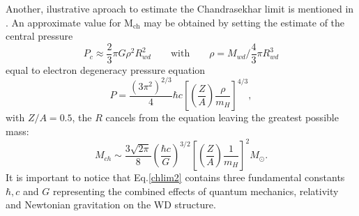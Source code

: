 \documentclass[oneside,a4paper,11pt]{report}
\begin{document}
                                                                                                                                                                                                                                                                                                                                                                                                                                                                                                                                                                                                                                                                                                                                                                                                                                                                                                                                                                                                                                                                                                                                                                                                                                                                                                                                                                                                                                                                                                                                                                                                                                                                                                                                                                                                                                       
Another, ilustrative aproach to estimate the Chandrasekhar limit is mentioned in \citet{2007ima..book.....C}. An approximate value for $\mathrm{M_{ch}}$ may be 
obtained by setting the estimate of the central pressure
\begin{equation}
 P_c \approx \frac{2}{3} \pi G \rho^2 R_{wd}^2 \qquad \text{with} \qquad \rho=M_{wd} / \frac{4}{3} \pi R_{wd}^3  
\end{equation}
equal to electron degeneracy pressure equation
\begin{equation}
 \label{edegP}
P = \frac{(3\pi^2)^{2/3}}{4} \hbar c \left[ \left( \frac{Z}{A}\right) \frac{\rho}{m_H}\right]^{4/3},
\end{equation}
with $Z/A=0.5$, the $R$ cancels from the equation leaving the greatest possible mass:
\begin{equation}
 \label{chlim2}
M_{ch} \sim \frac{3\sqrt{2\pi}}{8}\left ( \frac{\hbar c}{G} \right )^{3/2}\left [ \left ( \frac{Z}{A} \right ) \frac{1}{m_H} \right ]^2 M_\odot.  
\end{equation}
It is important to notice that Eq.\eqref{chlim2} contains three fundamental constants $\hbar, c$ and $G$ representing the combined effects of quantum mechanics, 
relativity and Newtonian gravitation on the WD structure. 
\end{document}
